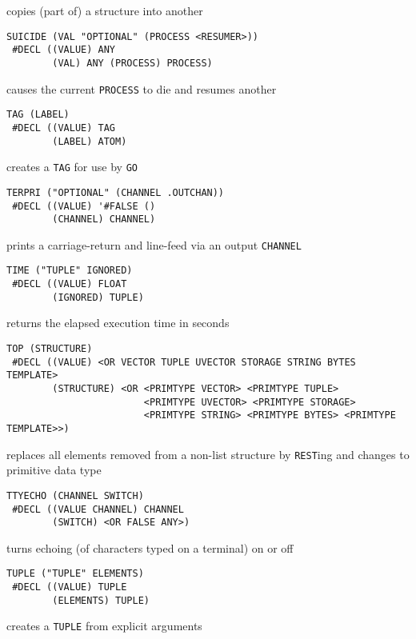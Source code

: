 \documentclass[a4paper,]{article}
\begin{document}
copies (part of) a structure into another

\begin{verbatim}
SUICIDE (VAL "OPTIONAL" (PROCESS <RESUMER>))
 #DECL ((VALUE) ANY
        (VAL) ANY (PROCESS) PROCESS)
\end{verbatim}

causes the current \texttt{PROCESS} to die and resumes another

\begin{verbatim}
TAG (LABEL)
 #DECL ((VALUE) TAG
        (LABEL) ATOM)
\end{verbatim}

creates a \texttt{TAG} for use by \texttt{GO}

\begin{verbatim}
TERPRI ("OPTIONAL" (CHANNEL .OUTCHAN))
 #DECL ((VALUE) '#FALSE ()
        (CHANNEL) CHANNEL)
\end{verbatim}

prints a carriage-return and line-feed via an output \texttt{CHANNEL}

\begin{verbatim}
TIME ("TUPLE" IGNORED)
 #DECL ((VALUE) FLOAT
        (IGNORED) TUPLE)
\end{verbatim}

returns the elapsed execution time in seconds

\begin{verbatim}
TOP (STRUCTURE)
 #DECL ((VALUE) <OR VECTOR TUPLE UVECTOR STORAGE STRING BYTES TEMPLATE>
        (STRUCTURE) <OR <PRIMTYPE VECTOR> <PRIMTYPE TUPLE>
                        <PRIMTYPE UVECTOR> <PRIMTYPE STORAGE>
                        <PRIMTYPE STRING> <PRIMTYPE BYTES> <PRIMTYPE TEMPLATE>>)
\end{verbatim}

replaces all elements removed from a non-list structure by \texttt{REST}ing and changes to primitive data type

\begin{verbatim}
TTYECHO (CHANNEL SWITCH)
 #DECL ((VALUE CHANNEL) CHANNEL
        (SWITCH) <OR FALSE ANY>)
\end{verbatim}

turns echoing (of characters typed on a terminal) on or off

\begin{verbatim}
TUPLE ("TUPLE" ELEMENTS)
 #DECL ((VALUE) TUPLE
        (ELEMENTS) TUPLE)
\end{verbatim}

creates a \texttt{TUPLE} from explicit arguments
\end{document}
